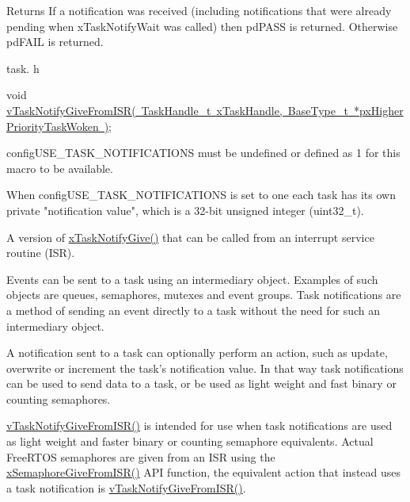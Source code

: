 \begin{DoxyReturn}{Returns}
If a notification was received (including notifications that were already pending when x\+Task\+Notify\+Wait was called) then pd\+P\+A\+SS is returned. Otherwise pd\+F\+A\+IL is returned.
\end{DoxyReturn}
task. h 
\begin{DoxyPre}void \mbox{\hyperlink{task_8h_a4a4bcf98ad282a596e13f3f30582a11b}{vTaskNotifyGiveFromISR( TaskHandle\_t xTaskHandle, BaseType\_t *pxHigherPriorityTaskWoken )}};\end{DoxyPre}



\begin{DoxyPre}configUSE\_TASK\_NOTIFICATIONS must be undefined or defined as 1 for this macro
to be available.\end{DoxyPre}



\begin{DoxyPre}When configUSE\_TASK\_NOTIFICATIONS is set to one each task has its own private
"notification value", which is a 32-bit unsigned integer (uint32\_t).\end{DoxyPre}



\begin{DoxyPre}A version of \mbox{\hyperlink{task_8h_ac60cbd05577a3e4f3c3587dd9b213930}{xTaskNotifyGive()}} that can be called from an interrupt service
routine (ISR).\end{DoxyPre}



\begin{DoxyPre}Events can be sent to a task using an intermediary object.  Examples of such
objects are queues, semaphores, mutexes and event groups.  Task notifications
are a method of sending an event directly to a task without the need for such
an intermediary object.\end{DoxyPre}



\begin{DoxyPre}A notification sent to a task can optionally perform an action, such as
update, overwrite or increment the task's notification value.  In that way
task notifications can be used to send data to a task, or be used as light
weight and fast binary or counting semaphores.\end{DoxyPre}



\begin{DoxyPre}\mbox{\hyperlink{task_8h_a4a4bcf98ad282a596e13f3f30582a11b}{vTaskNotifyGiveFromISR()}} is intended for use when task notifications are
used as light weight and faster binary or counting semaphore equivalents.
Actual FreeRTOS semaphores are given from an ISR using the
\mbox{\hyperlink{semphr_8h_a68aa43df8b2a0dbe17d05fad74670ef0}{xSemaphoreGiveFromISR()}} API function, the equivalent action that instead uses
a task notification is \mbox{\hyperlink{task_8h_a4a4bcf98ad282a596e13f3f30582a11b}{vTaskNotifyGiveFromISR()}}.\end{DoxyPre}



